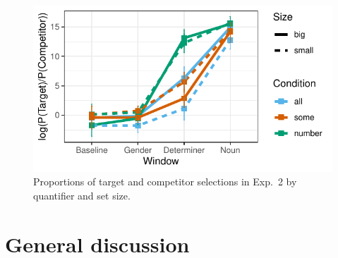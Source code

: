 \documentclass[10pt,letterpaper]{article}
\begin{document}
\begin{figure}[H]
\centering
\includegraphics[width=\columnwidth]{../../analysis/SunBreheny/main/graphs/results-idt}
\caption{Proportions of target and competitor selections in Exp.~2 by quantifier and set size.} 
\label{fig:results-idt}
\end{figure}

\section{General discussion}






%




\setlength{\bibleftmargin}{.125in}
\setlength{\bibindent}{-\bibleftmargin}


\end{document}
